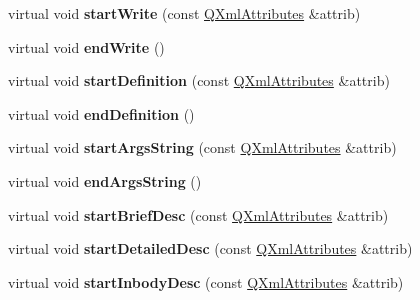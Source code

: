 \begin{DoxyCompactItemize}
\item 
\hypertarget{class_member_handler_a149815c30a56b146b8c9011a551fd499}{virtual void {\bfseries start\-Write} (const \hyperlink{class_q_xml_attributes}{Q\-Xml\-Attributes} \&attrib)}\label{class_member_handler_a149815c30a56b146b8c9011a551fd499}

\item 
\hypertarget{class_member_handler_a0d0efd284dfcdce56797f4923df93668}{virtual void {\bfseries end\-Write} ()}\label{class_member_handler_a0d0efd284dfcdce56797f4923df93668}

\item 
\hypertarget{class_member_handler_aeab3d571ffa1d5ea2e5279d87362d708}{virtual void {\bfseries start\-Definition} (const \hyperlink{class_q_xml_attributes}{Q\-Xml\-Attributes} \&attrib)}\label{class_member_handler_aeab3d571ffa1d5ea2e5279d87362d708}

\item 
\hypertarget{class_member_handler_aaf89a775fd92ec8042a6b830992475c1}{virtual void {\bfseries end\-Definition} ()}\label{class_member_handler_aaf89a775fd92ec8042a6b830992475c1}

\item 
\hypertarget{class_member_handler_af4fc5488362a0abf28f0ee7da842b728}{virtual void {\bfseries start\-Args\-String} (const \hyperlink{class_q_xml_attributes}{Q\-Xml\-Attributes} \&attrib)}\label{class_member_handler_af4fc5488362a0abf28f0ee7da842b728}

\item 
\hypertarget{class_member_handler_aa136384e92596b8789436065c8b40633}{virtual void {\bfseries end\-Args\-String} ()}\label{class_member_handler_aa136384e92596b8789436065c8b40633}

\item 
\hypertarget{class_member_handler_a104aa450d7ed98aaaf929bf81eb3252e}{virtual void {\bfseries start\-Brief\-Desc} (const \hyperlink{class_q_xml_attributes}{Q\-Xml\-Attributes} \&attrib)}\label{class_member_handler_a104aa450d7ed98aaaf929bf81eb3252e}

\item 
\hypertarget{class_member_handler_a94f6cc704f336be42dd887b95f86a106}{virtual void {\bfseries start\-Detailed\-Desc} (const \hyperlink{class_q_xml_attributes}{Q\-Xml\-Attributes} \&attrib)}\label{class_member_handler_a94f6cc704f336be42dd887b95f86a106}

\item 
\hypertarget{class_member_handler_ad7d997f3d9e850a7355a0eda7bfb5f75}{virtual void {\bfseries start\-Inbody\-Desc} (const \hyperlink{class_q_xml_attributes}{Q\-Xml\-Attributes} \&attrib)}\label{class_member_handler_ad7d997f3d9e850a7355a0eda7bfb5f75}


\end{DoxyCompactItemize}
